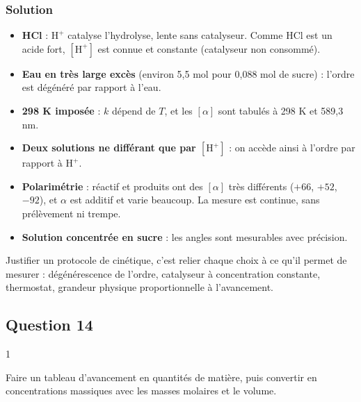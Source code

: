 \documentclass[11pt,a4paper]{article}
\providecommand{\tightlist}{\setlength{\itemsep}{0pt}\setlength{\parskip}{0pt}}
\begin{document}
\hypertarget{solution-12}{%
\subsubsection{Solution}\label{solution-12}}

\begin{itemize}
\tightlist
\item
  \textbf{HCl} : \(\mathrm{H^+}\) catalyse l'hydrolyse, lente sans catalyseur. Comme HCl est un acide fort, \([\mathrm{H^+}]\) est connue et constante (catalyseur non consommé).
\item
  \textbf{Eau en très large excès} (environ 5,5 mol pour 0,088 mol de sucre) : l'ordre est dégénéré par rapport à l'eau.
\item
  \textbf{298 K imposée} : \(k\) dépend de \(T\), et les \([\alpha]\) sont tabulés à 298 K et 589,3 nm.
\item
  \textbf{Deux solutions ne différant que par \([\mathrm{H^+}]\)} : on accède ainsi à l'ordre par rapport à \(\mathrm{H^+}\).
\item
  \textbf{Polarimétrie} : réactif et produits ont des \([\alpha]\) très différents (\(+66\), \(+52\), \(-92\)), et \(\alpha\) est additif et varie beaucoup. La mesure est continue, sans prélèvement ni trempe.
\item
  \textbf{Solution concentrée en sucre} : les angles sont mesurables avec précision.
\end{itemize}

\begin{methode}

Justifier un protocole de cinétique, c'est relier chaque choix à ce qu'il permet de mesurer : dégénérescence de l'ordre, catalyseur à concentration constante, thermostat, grandeur physique proportionnelle à l'avancement.

\end{methode}

\hypertarget{question-14}{%
\subsection{Question 14}\label{question-14}}

\begin{indication}{1}

Faire un tableau d'avancement en quantités de matière, puis convertir en concentrations massiques avec les masses molaires et le volume.

\end{indication}
\end{document}
